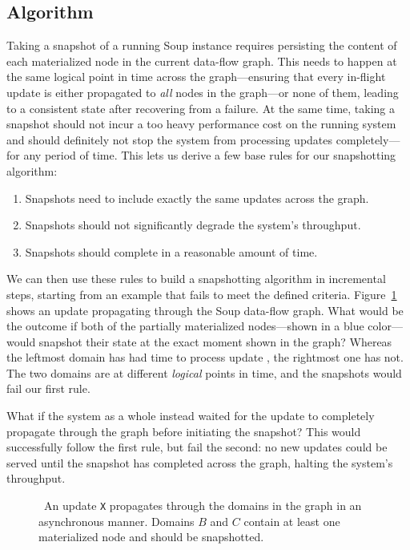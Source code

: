 \subsection{Algorithm}

Taking a snapshot of a running Soup instance requires persisting the content of
each materialized node in the current data-flow graph. This needs to happen at
the same logical point in time across the graph---ensuring that every in-flight
update is either propagated to \textit{all} nodes in the graph---or none of
them, leading to a consistent state after recovering from a failure. At the same
time, taking a snapshot should not incur a too heavy performance cost on the
running system and should definitely not stop the system from processing updates
completely---for any period of time. This lets us derive a few base rules for
our snapshotting algorithm:

\begin{enumerate}
  \item Snapshots need to include exactly the same updates across the graph.
  \item Snapshots should not significantly degrade the system's throughput.
  \item Snapshots should complete in a reasonable amount of time.
\end{enumerate}

We can then use these rules to build a snapshotting algorithm in incremental
steps, starting from an example that fails to meet the defined criteria.
Figure~\ref{fig:bad-example} shows an update propagating through the Soup
data-flow graph. What would be the outcome if both of the partially materialized
nodes---shown in a blue color---would snapshot their state at the exact moment
shown in the graph? Whereas the leftmost domain has had time to process update
, the rightmost one has not. The two domains are at different
\textit{logical} points in time, and the snapshots would fail our first rule.

What if the system as a whole instead waited for the update to completely
propagate through the graph before initiating the snapshot? This would
successfully follow the first rule, but fail the second: no new updates could be
served until the snapshot has completed across the graph, halting
the system's throughput.

\begin{figure}[H]
  \centering
  
  \caption{\
    An update \texttt{X} propagates through the domains in the graph in an
    asynchronous manner. Domains $ B $ and $ C $ contain at least one
    materialized node and should be snapshotted.
  }\label{fig:bad-example}
\end{figure}

